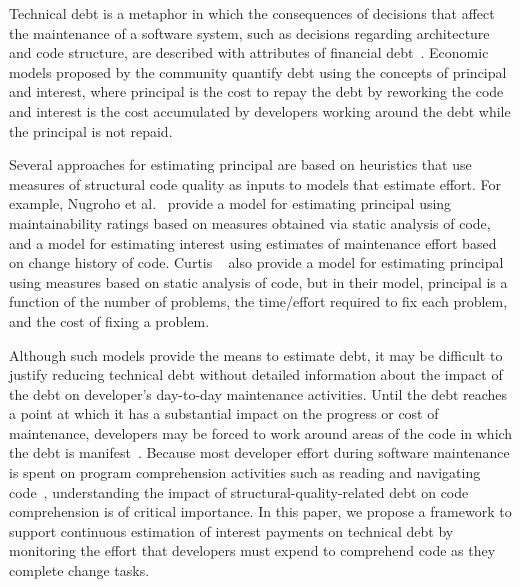 Technical debt is a metaphor in which the consequences of decisions that affect the maintenance of a software system, such as decisions regarding architecture and code structure, are described with attributes of financial debt~\cite{Cunningham:1992}. Economic models proposed by the \TD community quantify debt using the concepts of principal and interest, where principal is the cost to repay the debt by reworking the code and interest is the cost accumulated by developers working around the debt while the principal is not repaid.

Several approaches for estimating principal are based on heuristics that use measures of structural code quality as inputs to models that estimate effort. For example, Nugroho et al.~\cite{Nugroho_etal:2011} provide a model for estimating principal using maintainability ratings based on measures obtained via static analysis of code, and a model for estimating interest using estimates of maintenance effort based on change history of code. Curtis \etal~\cite{Curtis_etal:2012} also provide a model for estimating principal using measures based on static analysis of code, but in their model, principal is a function of the number of problems, the time/effort required to fix each problem, and the cost of fixing a problem.

Although such models provide the means to estimate debt, it may be difficult to justify reducing technical debt without detailed information about the impact of the debt on developer's day-to-day maintenance activities. Until the debt reaches a point at which it has a substantial impact on the progress or cost of maintenance, developers may be forced to work around areas of the code in which the debt is manifest~\cite{Ozkaya_etal:2011}. 
Because most developer effort during software maintenance is spent on program comprehension activities such as reading and navigating code~\cite{Fjeldstad_Hamlen:1982,Standish:1984,vonMayrhauser_etal:1997,Ko_etal:2006,LaToza_etal:2006,Tiarks:2011}, understanding the impact of structural-quality-related debt on code comprehension is of critical importance. In this paper, we propose a framework to support continuous estimation of interest payments on technical debt by monitoring the effort that developers must expend to comprehend code as they complete change tasks. 

